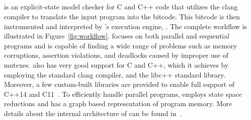 \subsection{\divine}

\divine is an explicit-state model checker for C and C++ code that utilizes the clang compiler to translate the input program into the \llvm bitcode.
This bitcode is then instrumented and interpreted by \divine's execution engine, \divm.
The complete workflow is illustrated in Figure~\ref{fig:workflow}.
\divine focuses on both parallel and sequential programs and is capable of finding a wide range of problems such as memory corruptions, assertion violations, and deadlocks caused by improper use of mutexes.
\divine also has very good support for C and C++, which it achieves by
employing the standard clang compiler, and the libc++ standard library.
Moreover, a few custom-built libraries are provided to enable full support of C++14 and C11~\cite{DIVINEToolPaper2017,SRB2017except}.
To efficiently handle parallel programs, \divine employs state space reductions and has a graph based representation of program memory.
More details about the internal architecture of \divine can be found in~\cite{RSCB2018}.

